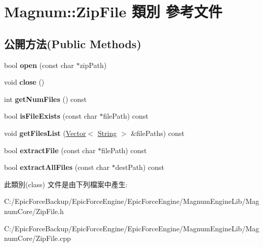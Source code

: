 \hypertarget{class_magnum_1_1_zip_file}{}\section{Magnum\+:\+:Zip\+File 類別 參考文件}
\label{class_magnum_1_1_zip_file}
\subsection*{公開方法(Public Methods)}
\begin{DoxyCompactItemize}
\item 
bool {\bfseries open} (const char $\ast$zip\+Path)\hypertarget{class_magnum_1_1_zip_file_a93fa349f96a7de789278a07ad2fefe02}{}\label{class_magnum_1_1_zip_file_a93fa349f96a7de789278a07ad2fefe02}

\item 
void {\bfseries close} ()\hypertarget{class_magnum_1_1_zip_file_a6bfa8ce114807b28c7e06b682dad27c3}{}\label{class_magnum_1_1_zip_file_a6bfa8ce114807b28c7e06b682dad27c3}

\item 
int {\bfseries get\+Num\+Files} () const \hypertarget{class_magnum_1_1_zip_file_a99fc99a34f5858ff581b9ce064203f7c}{}\label{class_magnum_1_1_zip_file_a99fc99a34f5858ff581b9ce064203f7c}

\item 
bool {\bfseries is\+File\+Exists} (const char $\ast$file\+Path) const \hypertarget{class_magnum_1_1_zip_file_a1916c879e13dd1aa55ee0c6869ce2743}{}\label{class_magnum_1_1_zip_file_a1916c879e13dd1aa55ee0c6869ce2743}

\item 
void {\bfseries get\+Files\+List} (\hyperlink{class_magnum_1_1_vector}{Vector}$<$ \hyperlink{class_magnum_1_1_string}{String} $>$ \&file\+Paths) const \hypertarget{class_magnum_1_1_zip_file_a9a8732cbe010433281fb26c8910cd6d0}{}\label{class_magnum_1_1_zip_file_a9a8732cbe010433281fb26c8910cd6d0}

\item 
bool {\bfseries extract\+File} (const char $\ast$file\+Path) const \hypertarget{class_magnum_1_1_zip_file_afcba65f7cd0cee67eb61047efe5aac51}{}\label{class_magnum_1_1_zip_file_afcba65f7cd0cee67eb61047efe5aac51}

\item 
bool {\bfseries extract\+All\+Files} (const char $\ast$dest\+Path) const \hypertarget{class_magnum_1_1_zip_file_ad9899a35424e65fd276f9c8ee1c9be53}{}\label{class_magnum_1_1_zip_file_ad9899a35424e65fd276f9c8ee1c9be53}

\end{DoxyCompactItemize}


此類別(class) 文件是由下列檔案中產生\+:\begin{DoxyCompactItemize}
\item 
C\+:/\+Epic\+Force\+Backup/\+Epic\+Force\+Engine/\+Epic\+Force\+Engine/\+Magnum\+Engine\+Lib/\+Magnum\+Core/Zip\+File.\+h\item 
C\+:/\+Epic\+Force\+Backup/\+Epic\+Force\+Engine/\+Epic\+Force\+Engine/\+Magnum\+Engine\+Lib/\+Magnum\+Core/Zip\+File.\+cpp\end{DoxyCompactItemize}
